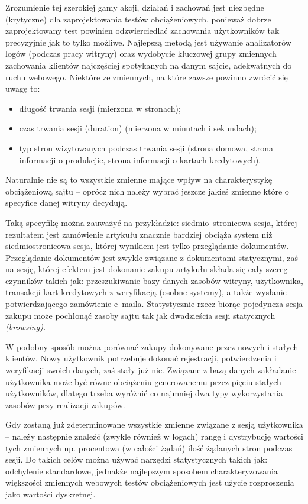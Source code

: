 \begin{enumerate}
\begin{description}
Zrozumienie tej szerokiej gamy akcji, działań i zachowań jest niezbędne (krytyczne) dla zaprojektowania testów obciążeniowych, 
ponieważ dobrze zaprojektowany test powinien odzwierciedlać zachowania użytkowników tak precyzyjnie jak to tylko możliwe. 
Najlepszą metodą jest używanie analizatorów logów (podczas pracy witryny) oraz wydobycie kluczowej grupy zmiennych zachowania 
klientów najczęściej spotykanych na danym sajcie, adekwatnych do ruchu webowego. Niektóre ze zmiennych, na które zawsze 
powinno zwrócić się uwagę to:
	\begin{itemize}
	\item długość trwania sesji (mierzona w stronach);
	\item czas trwania sesji (duration) (mierzona w minutach i sekundach);
	\item typ stron wizytowanych podczas trwania sesji (strona domowa, strona informacji o produkcjie, strona informacji o kartach 
	kredytowych).
	\end{itemize}

Naturalnie nie są to wszystkie zmienne mające wpływ na charakterystykę obciążeniową sajtu -- oprócz nich należy wybrać jeszcze 
jakieś zmienne które o specyfice danej witryny decydują.

Taką specyfikę można zauważyć na przykładzie: siedmio--stronicowa sesja, której rezultatem jest zamówienie artykułu znacznie 
bardziej obciąża system niż siedmiostronicowa sesja, której wynikiem jest tylko przeglądanie dokumentów. Przeglądanie 
dokumentów jest zwykle związane z dokumentami statycznymi, zaś na sesję, której efektem jest dokonanie zakupu artykułu składa 
się cały szereg czynników takich jak: przeszukiwanie bazy danych zasobów witryny, użytkownika, transakcji kart kredytowych z 
weryfikacją (osobne systemy), a także wysłanie potwierdzającego zamówienie e--maila. Statystycznie rzecz biorąc pojedyncza 
sesja zakupu może pochłonąć zasoby sajtu tak jak dwadzieścia sesji statycznych \emph{(browsing)}. 

W podobny sposób można porównać zakupy dokonywane przez nowych i stałych klientów. Nowy użytkownik potrzebuje dokonać 
rejestracji, potwierdzenia i weryfikacji swoich danych, zaś stały już nie. Związane z bazą danych zakładanie użytkownika może 
być równe obciążeniu generowanemu przez pięciu stałych użytkowników, dlatego trzeba wyróżnić co najmniej dwa typy 
wykorzystania zasobów przy realizacji zakupów.

Gdy zostaną już zdeterminowane wszystkie zmienne związane z sesją użytkownika -- należy następnie znaleźć (zwykle również w 
logach) rangę i dystrybucję wartości tych zmiennych np. procentowa (w całości żądań) ilość żądanych stron podczas sesji.  Do 
takich celów można używać narzędzi statystycznych takich jak: odchylenie standardowe, jednakże najlepszym sposobem 
charakteryzowania większości zmiennych webowych testów obciążeniowych jest użycie rozproszenia jako wartości dyskretnej.


\end{description}
\end{enumerate}
